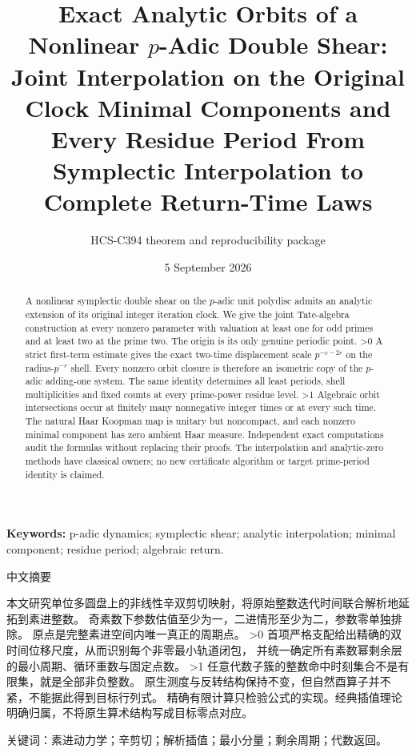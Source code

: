 \documentclass[10pt]{article}
\title{Exact Analytic Orbits of a Nonlinear $p$-Adic Double Shear:\\
\ifcase\CRevisionRound Joint Interpolation on the Original Clock
\or Minimal Components and Every Residue Period
\else From Symplectic Interpolation to Complete Return-Time Laws\fi}
\author{HCS-C394 theorem and reproducibility package}
\date{5 September 2026}
\begin{document}
\maketitle
\begin{abstract}
A nonlinear symplectic double shear on the $p$-adic unit polydisc admits
an analytic extension of its original integer iteration clock. We give
the joint Tate-algebra construction at every nonzero parameter with
valuation at least one for odd primes and at least two at the prime two.
The origin is its only genuine periodic point.
\ifnum\CRevisionRound>0
A strict first-term estimate gives the exact two-time displacement scale
$p^{-c-2r}$ on the radius-$p^{-r}$ shell. Every nonzero orbit closure is
therefore an isometric copy of the $p$-adic adding-one system. The same
identity determines all least periods, shell multiplicities and fixed
counts at every prime-power residue level.
\fi
\ifnum\CRevisionRound>1
Algebraic orbit intersections occur at finitely many nonnegative integer
times or at every such time. The natural Haar Koopman map is unitary but
noncompact, and each nonzero minimal component has zero ambient Haar measure.
\fi
Independent exact computations audit the formulas without replacing their
proofs. The interpolation and analytic-zero methods have classical owners;
no new certificate algorithm or target prime-period identity is claimed.
\end{abstract}
\noindent\textbf{Keywords:} p-adic dynamics; symplectic shear; analytic interpolation; minimal component; residue period; algebraic return.
\begin{otherlanguage}{chinese-simplified}
\begin{center}{\large 中文摘要}\end{center}
\begin{sloppypar}
本文研究单位多圆盘上的非线性辛双剪切映射，将原始整数迭代时间联合解析地延拓到素进整数。
奇素数下参数估值至少为一，二进情形至少为二，参数零单独排除。
原点是完整素进空间内唯一真正的周期点。
\ifnum\CRevisionRound>0
首项严格支配给出精确的双时间位移尺度，从而识别每个非零最小轨道闭包，
并统一确定所有素数幂剩余层的最小周期、循环重数与固定点数。
\fi
\ifnum\CRevisionRound>1
任意代数子簇的整数命中时刻集合不是有限集，就是全部非负整数。
原生测度与反转结构保持不变，但自然酉算子并不紧，不能据此得到目标行列式。
\fi
精确有限计算只检验公式的实现。经典插值理论明确归属，不将原生算术结构写成目标零点对应。
\end{sloppypar}
\noindent 关键词：素进动力学；辛剪切；解析插值；最小分量；剩余周期；代数返回。
\end{otherlanguage}
\end{document}
